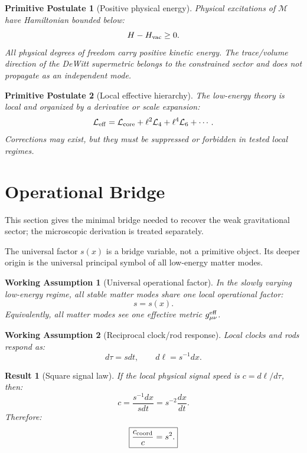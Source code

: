 \documentclass[11pt]{article}
\newtheorem{postulate}{Primitive Postulate}
\newtheorem{assumption}{Working Assumption}
\newtheorem{result}{Result}
\begin{document}
\begin{postulate}[Positive physical energy]
Physical excitations of $\mathcal M$ have Hamiltonian bounded below:
\[
H-H_{\rm vac}\ge0.
\]
All physical degrees of freedom carry positive kinetic energy.
The trace/volume direction of the DeWitt supermetric belongs to the
constrained sector and does not propagate as an independent mode.
\end{postulate}

\begin{postulate}[Local effective hierarchy]
The low-energy theory is local and organized by a derivative or scale expansion:
\[
\mathcal L_{\rm eff}
=
\mathcal L_{\rm core}
+\ell^2\mathcal L_4
+\ell^4\mathcal L_6
+\cdots.
\]
Corrections may exist, but they must be suppressed or forbidden in tested local
regimes.
\end{postulate}

\section{Operational Bridge}

This section gives the minimal bridge needed to recover the weak gravitational
sector; the microscopic derivation is treated separately.

The universal factor $s(x)$ is a bridge variable, not a primitive object.  Its
deeper origin is the universal principal symbol of all low-energy matter modes.

\begin{assumption}[Universal operational factor]
In the slowly varying low-energy regime, all stable matter modes share one local
operational factor:
\[
s=s(x).
\]
Equivalently, all matter modes see one effective metric
$g_{\mu\nu}^{\rm eff}$.
\end{assumption}

\begin{assumption}[Reciprocal clock/rod response]
Local clocks and rods respond as:
\[
d\tau=sdt,
\qquad
d\ell=s^{-1}dx.
\]
\end{assumption}

\begin{result}[Square signal law]
If the local physical signal speed is $c=d\ell/d\tau$, then:
\[
c
=
\frac{s^{-1}dx}{sdt}
=
s^{-2}\frac{dx}{dt}.
\]
Therefore:
\[
\boxed{
\frac{c_{\rm coord}}{c}=s^2.
}
\]
\end{result}
\end{document}
